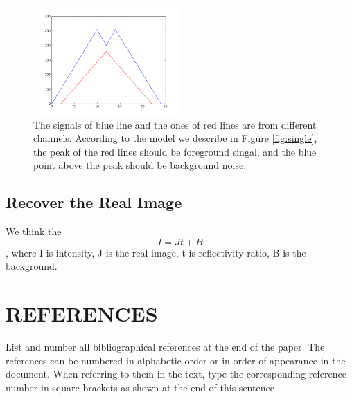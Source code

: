 \documentclass{article}
\begin{document}
\begin{figure}
	\includegraphics[width=0.5\textwidth]{figure_2.png}
	\caption{The signals of blue line and the ones of red lines are from different channels. According to the model we describe in Figure \ref{fig:single}, the peak of the red lines should be foreground singal, and the blue point above the peak should be background noise.}
	\label{fig:two_points}
\end{figure}
\subsection{Recover the Real Image}
We think the $$I = Jt + B$$, where I is intensity, J is the real image, t is reflectivity ratio, B is the background.






\vfill
\pagebreak


\section{REFERENCES}
\label{sec:ref}

List and number all bibliographical references at the end of the paper.  The references can be numbered in alphabetic order or in order of appearance in the document.  When referring to them in the text, type the corresponding reference number in square brackets as shown at the end of this sentence \cite{C2}.



\end{document}
